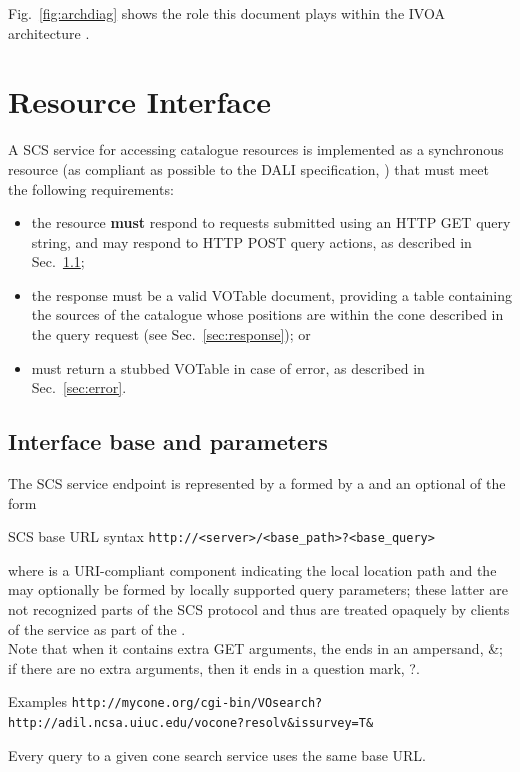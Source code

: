 \documentclass[11pt,a4paper]{ivoa}
\begin{document}
Fig.~\ref{fig:archdiag} shows the role this document plays within the
IVOA architecture \citep{note:VOARCH}.

\section{Resource Interface}
\label{sec:resif}

A SCS service for accessing catalogue resources is implemented as a synchronous resource (as compliant as possible to the DALI specification, \citet{std:DALI}) that must meet the following requirements:
\begin{itemize}
	\item the resource \textbf{must} respond to requests submitted using an HTTP GET query string, and may respond to HTTP POST query actions, as described in Sec.~\ref{sec:basepar};
	\item the response must be a valid VOTable document, providing a table containing the sources of the catalogue whose positions are within the cone described in the query request (see Sec.~\ref{sec:response}); or
	\item must return a stubbed VOTable in case of error, as described in Sec.~\ref{sec:error}.
\end{itemize}

\subsection{Interface base and parameters}
\label{sec:basepar}
The SCS service endpoint is represented by a  formed by a  and an optional  of the form
\begin{bigdescription}
	\item[SCS base URL syntax] \texttt{http://<server>/<base\_path>?<base\_query>}
\end{bigdescription}
where  is a URI-compliant component indicating the local location path and the  may optionally be formed by locally supported query parameters; these latter are not recognized parts of the SCS protocol and thus are treated opaquely by clients of the service as part of the .\\
Note that when it contains extra GET arguments, the  ends in an ampersand, \&; if there are no extra arguments, then it ends in a question mark, ?.\\
		\begin{bigdescription}
		\item[Examples] \texttt{http://mycone.org/cgi-bin/VOsearch?}\\
		\texttt{http://adil.ncsa.uiuc.edu/vocone?resolv\&issurvey=T\&}
		\end{bigdescription}
Every query to a given cone search service uses the same base URL.
\end{document}
